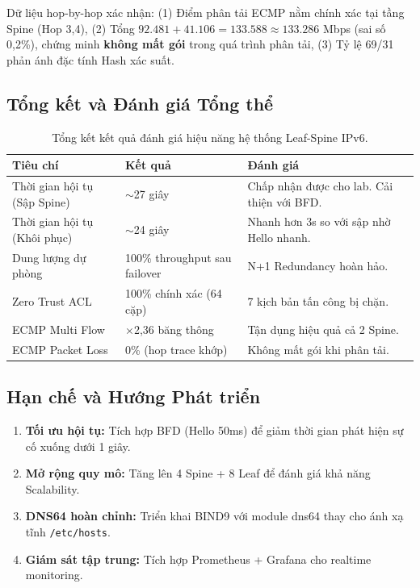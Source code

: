 Dữ liệu hop-by-hop xác nhận: (1) Điểm phân tải ECMP nằm chính xác tại tầng Spine (Hop 3,4), (2) Tổng $92.481 + 41.106 = 133.588 \approx 133.286$ Mbps (sai số 0,2\%), chứng minh \textbf{không mất gói} trong quá trình phân tải, (3) Tỷ lệ 69/31 phản ánh đặc tính Hash xác suất.

\subsection{Tổng kết và Đánh giá Tổng thể}

\begin{table}[H]
    \centering
    \caption{Tổng kết kết quả đánh giá hiệu năng hệ thống Leaf-Spine IPv6.}
    \label{tab:overall_results}
    \begin{tabular}{|p{4cm}|p{4cm}|p{5.5cm}|}
        \hline
        \textbf{Tiêu chí} & \textbf{Kết quả} & \textbf{Đánh giá} \\
        \hline
        Thời gian hội tụ (Sập Spine) & $\sim$27 giây & Chấp nhận được cho lab. Cải thiện với BFD. \\
        \hline
        Thời gian hội tụ (Khôi phục) & $\sim$24 giây & Nhanh hơn 3s so với sập nhờ Hello nhanh. \\
        \hline
        Dung lượng dự phòng & 100\% throughput sau failover & N+1 Redundancy hoàn hảo. \\
        \hline
        Zero Trust ACL & 100\% chính xác (64 cặp) & 7 kịch bản tấn công bị chặn. \\
        \hline
        ECMP Multi Flow & $\times$2,36 băng thông & Tận dụng hiệu quả cả 2 Spine. \\
        \hline
        ECMP Packet Loss & 0\% (hop trace khớp) & Không mất gói khi phân tải. \\
        \hline
    \end{tabular}
\end{table}

\subsection{Hạn chế và Hướng Phát triển}

\begin{enumerate}
    \item \textbf{Tối ưu hội tụ:} Tích hợp BFD (Hello 50ms) để giảm thời gian phát hiện sự cố xuống dưới 1 giây.
    \item \textbf{Mở rộng quy mô:} Tăng lên 4 Spine + 8 Leaf để đánh giá khả năng Scalability.
    \item \textbf{DNS64 hoàn chỉnh:} Triển khai BIND9 với module dns64 thay cho ánh xạ tĩnh \texttt{/etc/hosts}.
    \item \textbf{Giám sát tập trung:} Tích hợp Prometheus + Grafana cho realtime monitoring.
\end{enumerate}


